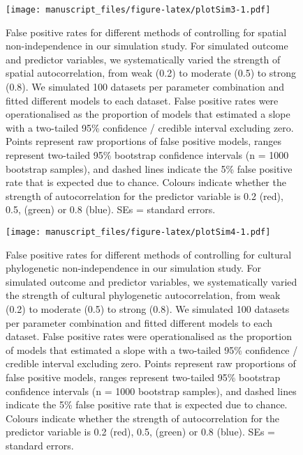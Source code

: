 \documentclass[
  man,floatsintext]{apa6}
\begin{document}
\begin{figure}
\centering
\texttt{[image: manuscript\_files/figure-latex/plotSim3-1.pdf]}
\caption{\label{fig:plotSim3}False positive rates for different methods of controlling for spatial non-independence in our simulation study. For simulated outcome and predictor variables, we systematically varied the strength of spatial autocorrelation, from weak (0.2) to moderate (0.5) to strong (0.8). We simulated 100 datasets per parameter combination and fitted different models to each dataset. False positive rates were operationalised as the proportion of models that estimated a slope with a two-tailed 95\% confidence / credible interval excluding zero. Points represent raw proportions of false positive models, ranges represent two-tailed 95\% bootstrap confidence intervals (n = 1000 bootstrap samples), and dashed lines indicate the 5\% false positive rate that is expected due to chance. Colours indicate whether the strength of autocorrelation for the predictor variable is 0.2 (red), 0.5, (green) or 0.8 (blue). SEs = standard errors.}
\end{figure}



\begin{figure}
\centering
\texttt{[image: manuscript\_files/figure-latex/plotSim4-1.pdf]}
\caption{\label{fig:plotSim4}False positive rates for different methods of controlling for cultural phylogenetic non-independence in our simulation study. For simulated outcome and predictor variables, we systematically varied the strength of cultural phylogenetic autocorrelation, from weak (0.2) to moderate (0.5) to strong (0.8). We simulated 100 datasets per parameter combination and fitted different models to each dataset. False positive rates were operationalised as the proportion of models that estimated a slope with a two-tailed 95\% confidence / credible interval excluding zero. Points represent raw proportions of false positive models, ranges represent two-tailed 95\% bootstrap confidence intervals (n = 1000 bootstrap samples), and dashed lines indicate the 5\% false positive rate that is expected due to chance. Colours indicate whether the strength of autocorrelation for the predictor variable is 0.2 (red), 0.5, (green) or 0.8 (blue). SEs = standard errors.}
\end{figure}
\end{document}
